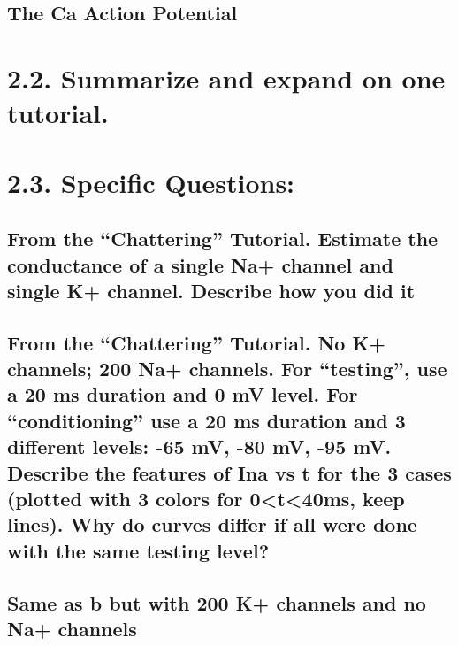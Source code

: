 \documentclass[11pt]{modart}
\begin{document}
\subsection{The Ca Action Potential}
\section{2.2. Summarize and expand on one tutorial.}
\section{2.3. Specific Questions:}
\subsection{From the “Chattering” Tutorial.  Estimate the conductance of a single Na+ 
channel and single K+ channel.  Describe how you did it}
\subsection{From the “Chattering” Tutorial.  No K+ channels; 200 Na+ channels.  For 
“testing”, use a 20 ms duration and 0 mV level.  For “conditioning” use a 20 ms 
duration and 3 different levels:  -65 mV, -80 mV, -95 mV.  Describe the features 
of Ina vs t for the 3 cases (plotted with 3 colors for 0<t<40ms, keep lines).  Why 
do curves differ if all were done with the same testing level?}
\subsection{Same as b but with 200 K+ channels and no Na+ channels}
\end{document}
